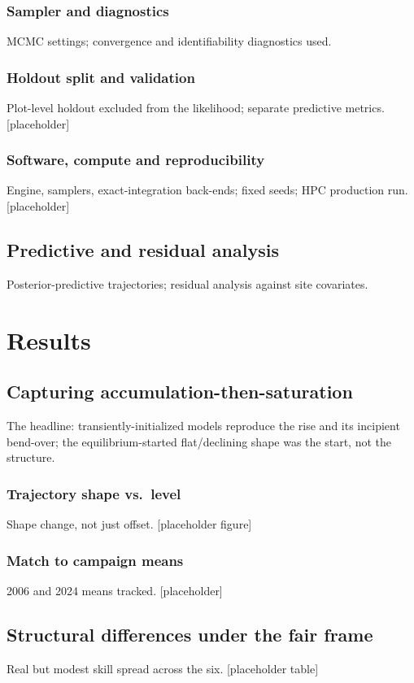 \documentclass[11pt]{article}
\begin{document}
\subsubsection{Sampler and diagnostics}
MCMC settings; convergence and identifiability diagnostics used.

\subsubsection{Holdout split and validation}
Plot-level holdout excluded from the likelihood; separate predictive metrics.
[placeholder]

\subsubsection{Software, compute and reproducibility}
Engine, samplers, exact-integration back-ends; fixed seeds; HPC production run.
[placeholder]

\subsection{Predictive and residual analysis}
Posterior-predictive trajectories; residual analysis against site covariates.

\section{Results}

\subsection{Capturing accumulation-then-saturation}
The headline: transiently-initialized models reproduce the rise and its
incipient bend-over; the equilibrium-started flat/declining shape was the
start, not the structure.

\subsubsection{Trajectory shape vs.\ level}
Shape change, not just offset. [placeholder figure]

\subsubsection{Match to campaign means}
2006 and 2024 means tracked. [placeholder]

\subsection{Structural differences under the fair frame}
Real but modest skill spread across the six. [placeholder table]
\end{document}
